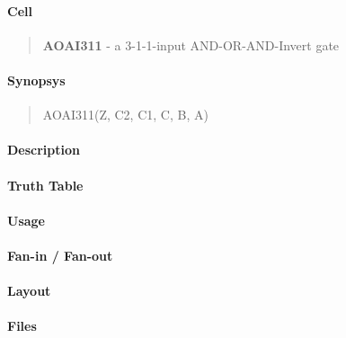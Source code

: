 \label{AOAI311}
\paragraph{Cell}
\begin{quote}
    \textbf{AOAI311} - a 3-1-1-input AND-OR-AND-Invert gate
\end{quote}

\paragraph{Synopsys}
\begin{quote}
    AOAI311(Z, C2, C1, C, B, A)
\end{quote}

\paragraph{Description}

%

\paragraph{Truth Table}
%

\paragraph{Usage}

\paragraph{Fan-in / Fan-out}

\paragraph{Layout}

\paragraph{Files}
